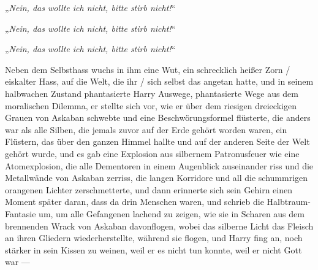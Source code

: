 „\emph{Nein, das wollte ich nicht, bitte stirb nicht!}“

„\emph{Nein, das wollte ich nicht, bitte stirb nicht!}“

„\emph{Nein, das wollte ich nicht, bitte stirb nicht!}“

Neben dem Selbsthass wuchs in ihm eine Wut, ein schrecklich heißer Zorn / eiskalter Hass, auf die Welt, die ihr / sich selbst das angetan hatte, und in seinem halbwachen Zustand phantasierte Harry Auswege, phantasierte Wege aus dem moralischen Dilemma, er stellte sich vor, wie er über dem riesigen dreieckigen Grauen von Askaban schwebte und eine Beschwörungsformel flüsterte, die anders war als alle Silben, die jemals zuvor auf der Erde gehört worden waren, ein Flüstern, das über den ganzen Himmel hallte und auf der anderen Seite der Welt gehört wurde, und es gab eine Explosion aus silbernem Patronusfeuer wie eine Atomexplosion, die alle Dementoren in einem Augenblick auseinander riss und die Metallwände von Askaban zerriss, die langen Korridore und all die schummrigen orangenen Lichter zerschmetterte, und dann erinnerte sich sein Gehirn einen Moment später daran, dass da drin Menschen waren, und schrieb die Halbtraum-Fantasie um, um alle Gefangenen lachend zu zeigen, wie sie in Scharen aus dem brennenden Wrack von Askaban davonflogen, wobei das silberne Licht das Fleisch an ihren Gliedern wiederherstellte, während sie flogen, und Harry fing an, noch stärker in sein Kissen zu weinen, weil er es nicht tun konnte, weil er nicht Gott war —

